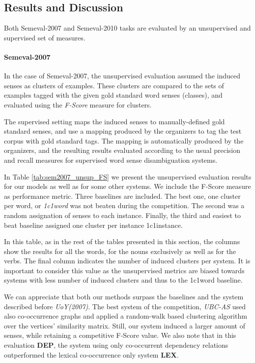 \subsection{Results and Discussion}
Both Semeval-2007 and Semeval-2010 tasks are evaluated by an unsupervised and supervised set of measures. 
\paragraph{Semeval-2007}
In the case of Semeval-2007, the unsupervised evaluation assumed the induced senses as clusters of examples. These clusters are compared to the sets of examples tagged with the given gold standard word senses (classes), and evaluated using the \textit{F-Score} measure for clusters. 
 
The supervised setting maps the induced senses to manually-defined gold standard senses, and use a mapping produced by the organizers to tag the test corpus with gold standard tags. The mapping is
automatically produced by the organizers, and the resulting results evaluated according to the
usual precision and recall measures for supervised word sense disambiguation systems. 


In Table \ref{tab:sem2007_unsup_FS} we present the unsupervised evaluation results for our models as well as for some other systems. We include the F-Score measure as performance metric. Three baselines are included. The best one, one cluster per word, or \textit{1c1word} was not beaten during the competition. The second was a random assignation of senses to each instance. Finally, the third and easiest to beat baseline assigned one cluster per instance {1c1instance}. 

In this table, as in the rest of the tables presented in this section, the columns show the results for all the words, for the nouns exclusively as well as for the verbs. The final column indicates the number of induced clusters per system. It is important to consider this value as the unsupervised metrics are biased towards systems with less number of induced clusters and thus to the 1c1word baseline.

We can appreciate that both our methods surpass the baselines and the system described before \textit{UoY(2007)}. The best system of the competition, \textit{UBC-AS} used also co-occurrence graphs and applied a random-walk based clustering algorithm over the vertices' similarity matrix. Still, our system induced a larger amount of senses, while retaining a competitive F-Score value. We also note that in this evaluation \textbf{DEP}, the system using only co-occurrent dependency relations outperformed the lexical co-occurrence only system \textbf{LEX}.

